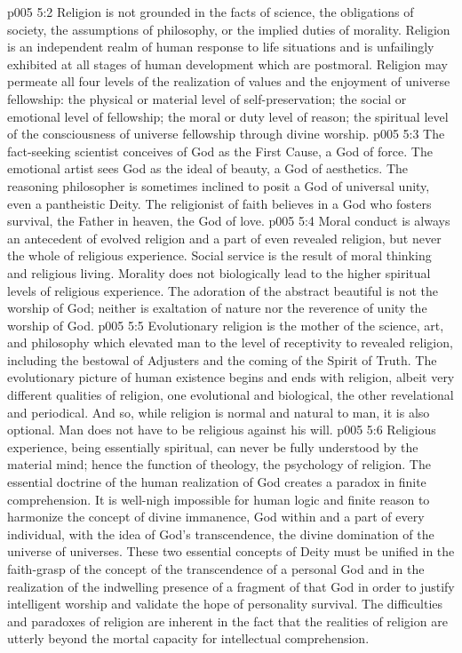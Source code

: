 \vs p005 5:2 Religion is not grounded in the facts of science, the obligations of society, the assumptions of philosophy, or the implied duties of morality. Religion is an independent realm of human response to life situations and is unfailingly exhibited at all stages of human development which are postmoral. Religion may permeate all four levels of the realization of values and the enjoyment of universe fellowship: the physical or material level of self\hyp{}preservation; the social or emotional level of fellowship; the moral or duty level of reason; the spiritual level of the consciousness of universe fellowship through divine worship.
\vs p005 5:3 The fact\hyp{}seeking scientist conceives of God as the First Cause, a God of force. The emotional artist sees God as the ideal of beauty, a God of aesthetics. The reasoning philosopher is sometimes inclined to posit a God of universal unity, even a pantheistic Deity. The religionist of faith believes in a God who fosters survival, the Father in heaven, the God of love.
\pc \vs p005 5:4 Moral conduct is always an antecedent of evolved religion and a part of even revealed religion, but never the whole of religious experience. Social service is the result of moral thinking and religious living. Morality does not biologically lead to the higher spiritual levels of religious experience. The adoration of the abstract beautiful is not the worship of God; neither is exaltation of nature nor the reverence of unity the worship of God.
\vs p005 5:5 Evolutionary religion is the mother of the science, art, and philosophy which elevated man to the level of receptivity to revealed religion, including the bestowal of Adjusters and the coming of the Spirit of Truth. The evolutionary picture of human existence begins and ends with religion, albeit very different qualities of religion, one evolutional and biological, the other revelational and periodical. And so, while religion is normal and natural to man, it is also optional. Man does not have to be religious against his will.
\pc \vs p005 5:6 Religious experience, being essentially spiritual, can never be fully understood by the material mind; hence the function of theology, the psychology of religion. The essential doctrine of the human realization of God creates a paradox in finite comprehension. It is well\hyp{}nigh impossible for human logic and finite reason to harmonize the concept of divine immanence, God within and a part of every individual, with the idea of God’s transcendence, the divine domination of the universe of universes. These two essential concepts of Deity must be unified in the faith\hyp{}grasp of the concept of the transcendence of a personal God and in the realization of the indwelling presence of a fragment of that God in order to justify intelligent worship and validate the hope of personality survival. The difficulties and paradoxes of religion are inherent in the fact that the realities of religion are utterly beyond the mortal capacity for intellectual comprehension.
